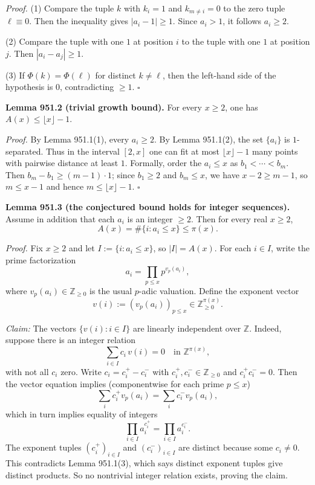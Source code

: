 \medskip
\noindent\emph{Proof.}
(1) Compare the tuple $k$ with $k_i=1$ and $k_{m\ne i}=0$ to the zero tuple $\ell\equiv0$.
Then the inequality gives $|a_i-1|\ge1$. Since $a_i>1$, it follows $a_i\ge2$.

(2) Compare the tuple with one $1$ at position $i$ to the tuple with one $1$ at position $j$.
Then $|a_i-a_j|\ge1$.

(3) If $\Phi(k)=\Phi(\ell)$ for distinct $k\ne\ell$, then the left-hand side of the hypothesis is $0$, contradicting $\ge1$.
\hfill $\square$

\medskip
\noindent\textbf{Lemma 951.2 (trivial growth bound).}
For every $x\ge2$, one has $A(x)\le \lfloor x\rfloor-1$.

\medskip
\noindent\emph{Proof.}
By Lemma 951.1(1), every $a_i\ge2$.
By Lemma 951.1(2), the set $\{a_i\}$ is $1$-separated.
Thus in the interval $[2,x]$ one can fit at most $\lfloor x\rfloor-1$ many points with pairwise distance at least $1$.
Formally, order the $a_i\le x$ as $b_1<\cdots<b_m$. Then $b_m-b_1\ge (m-1)\cdot 1$; since $b_1\ge2$ and $b_m\le x$, we have $x-2\ge m-1$, so $m\le x-1$ and hence $m\le\lfloor x\rfloor-1$.
\hfill $\square$

\medskip
\noindent\textbf{Lemma 951.3 (the conjectured bound holds for integer sequences).}
Assume in addition that each $a_i$ is an integer $\ge 2$.
Then for every real $x\ge2$,
\[
A(x)=\#\{i: a_i\le x\}\le \pi(x).
\]

\medskip
\noindent\emph{Proof.}
Fix $x\ge2$ and let $I:=\{i: a_i\le x\}$, so $|I|=A(x)$.
For each $i\in I$, write the prime factorization
\[
a_i=\prod_{p\le x} p^{v_p(a_i)},
\]
where $v_p(a_i)\in\mathbb Z_{\ge0}$ is the usual $p$-adic valuation.
Define the exponent vector
\[
v(i):=(v_p(a_i))_{p\le x}\in \mathbb Z_{\ge0}^{\pi(x)}.
\]

\emph{Claim:} The vectors $\{v(i): i\in I\}$ are linearly independent over $\mathbb Z$.
Indeed, suppose there is an integer relation
\[
\sum_{i\in I} c_i\, v(i)=0\quad\text{in }\mathbb Z^{\pi(x)},
\]
with not all $c_i$ zero.
Write $c_i=c_i^+-c_i^-$ with $c_i^+,c_i^-\in\mathbb Z_{\ge0}$ and $c_i^+c_i^-=0$.
Then the vector equation implies (componentwise for each prime $p\le x$)
\[
\sum_i c_i^+ v_p(a_i)=\sum_i c_i^- v_p(a_i),
\]
which in turn implies equality of integers
\[
\prod_{i\in I} a_i^{c_i^+}=\prod_{i\in I} a_i^{c_i^-}.
\]
The exponent tuples $(c_i^+)_{i\in I}$ and $(c_i^-)_{i\in I}$ are distinct because some $c_i\ne0$.
This contradicts Lemma 951.1(3), which says distinct exponent tuples give distinct products.
So no nontrivial integer relation exists, proving the claim.


